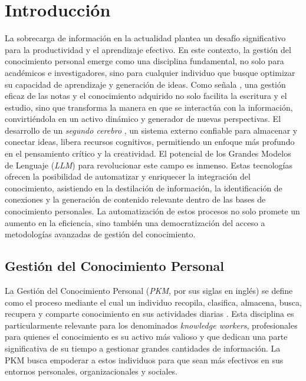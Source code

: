 \chapter{Introducción}
\label{chapter:introduccion}

La sobrecarga de información en la actualidad plantea un desafío significativo para la productividad y el aprendizaje efectivo. En este contexto, la gestión del conocimiento personal emerge como una disciplina fundamental, no solo para académicos e investigadores, sino para cualquier individuo que busque optimizar su capacidad de aprendizaje y generación de ideas. Como señala \cite{ahrensHowTakeSmart2017}, una gestión eficaz de las notas y el conocimiento adquirido no solo facilita la escritura y el estudio, sino que transforma la manera en que se interactúa con la información, convirtiéndola en un activo dinámico y generador de nuevas perspectivas. El desarrollo de un \textit{segundo cerebro} \parencite{forteBuildingSecondBrain2022}, un sistema externo confiable para almacenar y conectar ideas, libera recursos cognitivos, permitiendo un enfoque más profundo en el pensamiento crítico y la creatividad.
El potencial de los Grandes Modelos de Lenguaje (\textit{LLM}) para revolucionar este campo es inmenso. Estas tecnologías ofrecen la posibilidad de automatizar y enriquecer la integración del conocimiento, asistiendo en la destilación de información, la identificación de conexiones y la generación de contenido relevante dentro de las bases de conocimiento personales. La automatización de estos procesos no solo promete un aumento en la eficiencia, sino también una democratización del acceso a metodologías avanzadas de gestión del conocimiento.

\section{Gestión del Conocimiento Personal}
\label{sec:pkm}
La Gestión del Conocimiento Personal (\textit{PKM}, por sus siglas en inglés) se define como el proceso mediante el cual un individuo recopila, clasifica, almacena, busca, recupera y comparte conocimiento en sus actividades diarias \parencite{grundspenkisAgentBasedApproach2007}. Esta disciplina es particularmente relevante para los denominados \textit{knowledge workers}, profesionales para quienes el conocimiento es su activo más valioso y que dedican una parte significativa de su tiempo a gestionar grandes cantidades de información. La PKM busca empoderar a estos individuos para que sean más efectivos en sus entornos personales, organizacionales y sociales.

